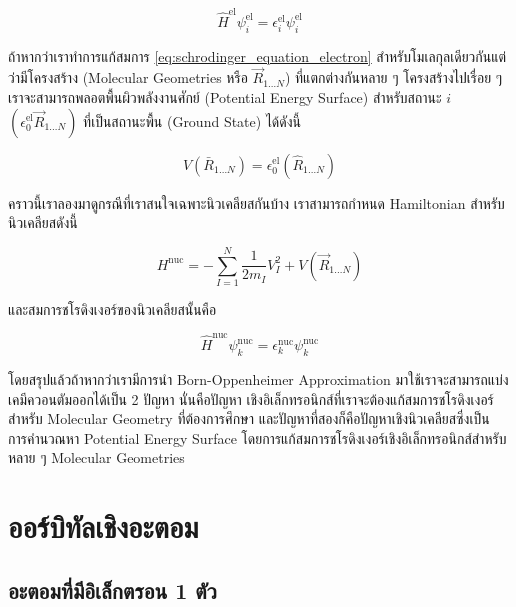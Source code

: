 \begin{equation}
  \label{eq:schrodinger_equation_electron}
  \hat{H}^{\text{el}} \psi^{\text{el}}_{i}
  =
  \epsilon^{\text{el}}_{i} \psi^{\text{el}}_{i}
\end{equation}

ถ้าหากว่าเราทำการแก้สมการ \eqref{eq:schrodinger_equation_electron} สำหรับโมเลกุลเดียวกันแต่ว่ามีโครงสร้าง (Molecular Geometries
หรือ $\vec{R}_{1 \dots N}$) ที่แตกต่างกันหลาย ๆ โครงสร้างไปเรื่อย ๆ เราจะสามารถพลอตพื้นผิวพลังงานศักย์ (Potential Energy Surface)
สำหรับสถานะ $i$ $(\epsilon^{\text{el}}_{0} \vec{R}_{1 \dots N})$ ที่เป็นสถานะพื้น (Ground State) ได้ดังนี้

\begin{equation}
  V\left(\bar{R}_{1 \dots N}\right)
  =
  \epsilon_{0}^{\mathrm{el}}\left(\hat{R}_{1 \dots N}\right)
\end{equation}

คราวนี้เราลองมาดูกรณีที่เราสนใจเฉพาะนิวเคลียสกันบ้าง เราสามารถกำหนด Hamiltonian สำหรับนิวเคลียสดังนี้

\begin{equation}
  \label{eq:hamiltonian_operator_nuclei}
  H^{\text{nuc}}
  =
  - \sum_{I=1}^{N} \frac{1}{2 m_{I}} V_{I}^{2}
  + V\left(\vec{R}_{1 \dots N}\right)
\end{equation}

\noindent และสมการชโรดิงเงอร์ของนิวเคลียสนั้นคือ

\begin{equation}
  \label{eq:schrodinger_equation_nuclei}
  \hat{H}^{\text{nuc}} \psi^{\text{nuc}}_{k}
  =
  \epsilon^{\text{nuc}}_{k} \psi^{\text{nuc}}_{k}
\end{equation}

โดยสรุปแล้วถ้าหากว่าเรามีการนำ Born-Oppenheimer Approximation มาใช้เราจะสามารถแบ่งเคมีควอนตัมออกได้เป็น 2 ปัญหา นั่นคือปัญหา%
เชิงอิเล็กทรอนิกส์ที่เราจะต้องแก้สมการชโรดิงเงอร์สำหรับ Molecular Geometry ที่ต้องการศึกษา และปัญหาที่สองก็คือปัญหาเชิงนิวเคลียสซึ่งเป็น%
การคำนวณหา Potential Energy Surface โดยการแก้สมการชโรดิงเงอร์เชิงอิเล็กทรอนิกส์สำหรับหลาย ๆ Molecular Geometries

\section{ออร์บิทัลเชิงอะตอม}

\subsection{อะตอมที่มีอิเล็กตรอน 1 ตัว}

